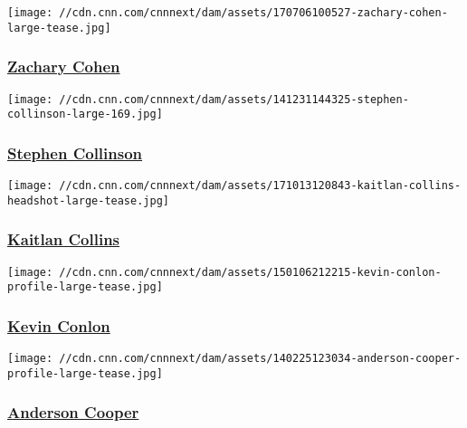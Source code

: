 \href{/profiles/zachary-cohen-profile}{}

\texttt{[image: //cdn.cnn.com/cnnnext/dam/assets/170706100527-zachary-cohen-large-tease.jpg]}

\hypertarget{zachary-cohen}{%
\subsubsection{\texorpdfstring{\href{/profiles/zachary-cohen-profile}{Zachary
Cohen}}{Zachary Cohen}}\label{zachary-cohen}}

\href{/profiles/stephen-collinson}{}

\texttt{[image: //cdn.cnn.com/cnnnext/dam/assets/141231144325-stephen-collinson-large-169.jpg]}

\hypertarget{stephen-collinson}{%
\subsubsection{\texorpdfstring{\href{/profiles/stephen-collinson}{Stephen
Collinson}}{Stephen Collinson}}\label{stephen-collinson}}

\href{/profiles/kaitlan-collins}{}

\texttt{[image: //cdn.cnn.com/cnnnext/dam/assets/171013120843-kaitlan-collins-headshot-large-tease.jpg]}

\hypertarget{kaitlan-collins}{%
\subsubsection{\texorpdfstring{\href{/profiles/kaitlan-collins}{Kaitlan
Collins}}{Kaitlan Collins}}\label{kaitlan-collins}}

\href{/profiles/kevin-conlon-profile}{}

\texttt{[image: //cdn.cnn.com/cnnnext/dam/assets/150106212215-kevin-conlon-profile-large-tease.jpg]}

\hypertarget{kevin-conlon}{%
\subsubsection{\texorpdfstring{\href{/profiles/kevin-conlon-profile}{Kevin
Conlon}}{Kevin Conlon}}\label{kevin-conlon}}

\href{/profiles/anderson-cooper-profile}{}

\texttt{[image: //cdn.cnn.com/cnnnext/dam/assets/140225123034-anderson-cooper-profile-large-tease.jpg]}

\hypertarget{anderson-cooper}{%
\subsubsection{\texorpdfstring{\href{/profiles/anderson-cooper-profile}{Anderson
Cooper}}{Anderson Cooper}}\label{anderson-cooper}}


